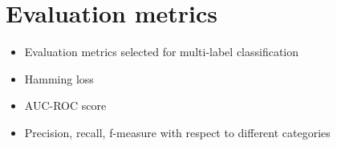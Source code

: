 \section{Evaluation metrics} \cite{tsoumakas2007multi}
\cite{zhang2013review}
    \begin{itemize}
        \item Evaluation metrics selected for multi-label classification 
        \item Hamming loss 
        \item AUC-ROC score 
        \item Precision, recall, f-measure with respect to different categories
    \end{itemize}
    